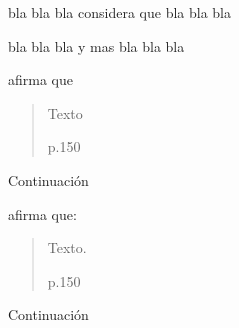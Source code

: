 bla bla bla \textcite{bibKey} considera que bla bla bla

bla bla bla y mas bla bla bla \Parencite{bibKey}



\textcite{bibKey} afirma que \blockquote[p.150]{Texto}. Continuación





\textcite{bibKey} afirma que: \blockquote[p.150]{Texto.} Continuación


